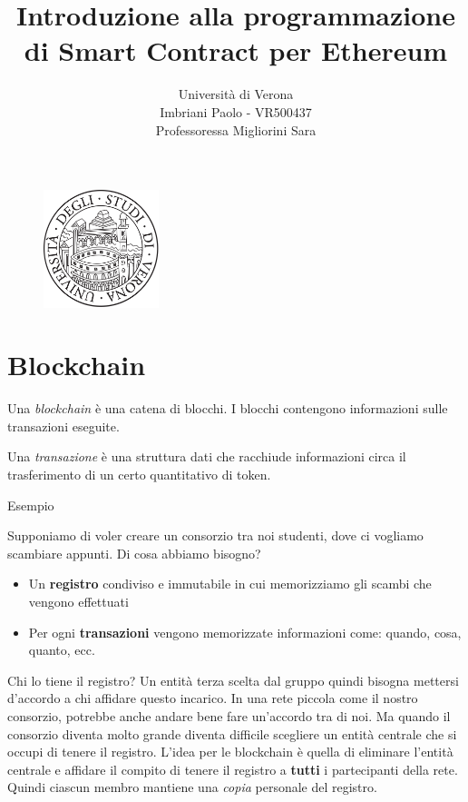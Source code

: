 \documentclass[a4paper]{article}
\title{Introduzione alla programmazione di Smart Contract per Ethereum}
\author{Università di Verona\\Imbriani Paolo - VR500437\\Professoressa Migliorini Sara}
\begin{document}
\begin{figure}
    \centering
    \includegraphics[width=0.3\textwidth]{UniversityofVerona.png}
\end{figure}

\maketitle 

\pagebreak

\tableofcontents

\pagebreak

\section{Blockchain}

\begin{definition}
    Una \textit{blockchain} è una catena di blocchi. I blocchi contengono informazioni sulle transazioni eseguite. 
\end{definition}

\begin{definition}
    Una \textit{transazione} è una struttura dati che racchiude informazioni circa il trasferimento di un certo quantitativo di token.
\end{definition}

\begin{examplebox}{Esempio}

    Supponiamo di voler creare un consorzio tra noi studenti, dove ci vogliamo scambiare appunti. 
    Di cosa abbiamo bisogno? 
    \begin{itemize}
        \item Un \textbf{registro} condiviso e immutabile in cui memorizziamo gli scambi che vengono effettuati
        \item Per ogni \textbf{transazioni} vengono memorizzate informazioni come: quando, cosa, quanto, ecc.
    \end{itemize}
    Chi lo tiene il registro? Un entità terza scelta dal gruppo quindi bisogna mettersi d'accordo a chi affidare questo incarico.
    In una rete piccola come il nostro consorzio, potrebbe anche andare bene fare un'accordo tra di noi. Ma quando il consorzio diventa molto grande diventa difficile scegliere un entità centrale
    che si occupi di tenere il registro. L'idea per le blockchain è quella di eliminare l'entità centrale e affidare il compito di tenere il registro a \textbf{tutti} i partecipanti della rete.
    Quindi ciascun membro mantiene una \textit{copia} personale del registro. 
\end{examplebox}
\noindent
\end{document}
